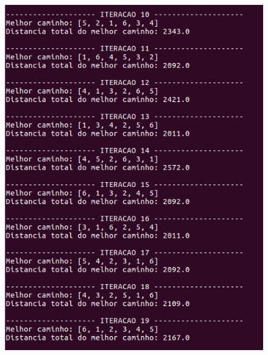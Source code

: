 \documentclass[hidelinks,12pt]{article}
\begin{document}
		\begin{figure}[!h]
			\centering
			\includegraphics[scale=0.6]{Figures/m6-1-2.png}
		\end{figure}

		\newpage
\end{document}
